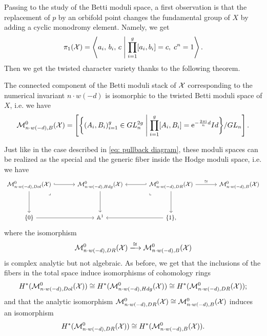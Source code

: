 \documentclass{article}
\begin{document}
Passing to the study of the Betti moduli space, a first observation is that the replacement of $p$ by an orbifold point changes the fundamental group of $X$ by adding a cyclic monodromy element. Namely, we get
\begin{equation} \label{eq: fundamental group of stacky curve}
\pi_1(\mathcal{X}) = \left\langle a_i, \, b_i, \, c \;\middle|\; \prod_{i = 1}^g [a_i, b_i] = c, \; c^n = 1 \right\rangle .
\end{equation}
Then we get the twisted character variety thanks to the following theorem.
\begin{introthm} \label{the: twisted character variety}
The connected component of the Betti moduli stack of $\mathcal{X}$ corresponding to the numerical invariant $n \cdot w(-d)$ is isomorphic to the twisted Betti moduli space of $X$, i.e. we have
\begin{equation}
\mathcal{M}_{n \cdot w(-d), B}^0(\mathcal{X}) = \left[ \bigg\{ (A_i, B_i)_{i = 1}^g \in GL_n^{2g} \;\middle|\; \prod_{i=1}^{g}[A_i, B_i] = \mathrm{e}^{-\frac{2 \pi \mathrm{i}}{n} d} Id \bigg\} / GL_n \right].
\end{equation}
\end{introthm}

Just like in the case described in \eqref{eq: pullback diagram}, these moduli spaces can be realized as the special and the generic fiber inside the Hodge moduli space, i.e. we have
\begin{equation}
\begin{tikzcd}[ampersand replacement=\&, column sep=large, row sep=huge]
        {\mc{M}_{n \cdot w(-d), Dol}^0(\XX)} \& {\mc{M}_{n \cdot w(-d),Hdg}^0(\XX)} \& {\mc{M}_{n \cdot w(-d), DR}^0(\XX)} \& {\mc{M}_{n \cdot w(-d),B}^0(\XX)} \\
        {\{ 0 \}} \& {\Ab^1} \& {\{ 1 \},}
        \arrow[hook, from=1-1, to=1-2]
        \arrow[from=1-1, to=2-1]
        \arrow["\lrcorner"{anchor=center, pos=0.125}, draw=none, from=1-1, to=2-2]
        \arrow[from=1-2, to=2-2]
        \arrow[hook', from=1-3, to=1-2]
        \arrow["\cong", from=1-3, to=1-4]
        \arrow["\lrcorner"{anchor=center, pos=0.125, rotate=-90}, draw=none, from=1-3, to=2-2]
        \arrow[from=1-3, to=2-3]
        \arrow[from=2-1, to=2-2]
        \arrow[from=2-3, to=2-2]
    \end{tikzcd}
\end{equation}
where the isomorphism
\begin{equation}
\mc{M}_{n \cdot w(-d), DR}^0(\XX) \xlongrightarrow{\cong} \mc{M}_{n \cdot w(-d),B}^0(\XX)
\end{equation}
is complex analytic but not algebraic. As before, we get that the inclusions of the fibers in the total space induce isomorphisms of cohomology rings
\begin{equation}
H^*(\mathcal{M}_{n \cdot w(-d), Dol}^0(\mathcal{X})) \cong H^*(\mathcal{M}_{n \cdot w(-d),Hdg}^0(\mathcal{X})) \cong H^*(\mathcal{M}_{n \cdot w(-d), DR}^0(\mathcal{X}));
\end{equation}
and that the analytic isomorphism $\mathcal{M}_{n \cdot w(-d), DR}^0(\mathcal{X}) \cong \mathcal{M}_{n \cdot w(-d),B}^0(\mathcal{X})$ induces an isomorphism
\begin{equation}
H^*(\mathcal{M}_{n \cdot w(-d), DR}^0(\mathcal{X})) \cong H^*(\mathcal{M}_{n \cdot w(-d),B}^0(\mathcal{X})).
\end{equation}
\end{document}
